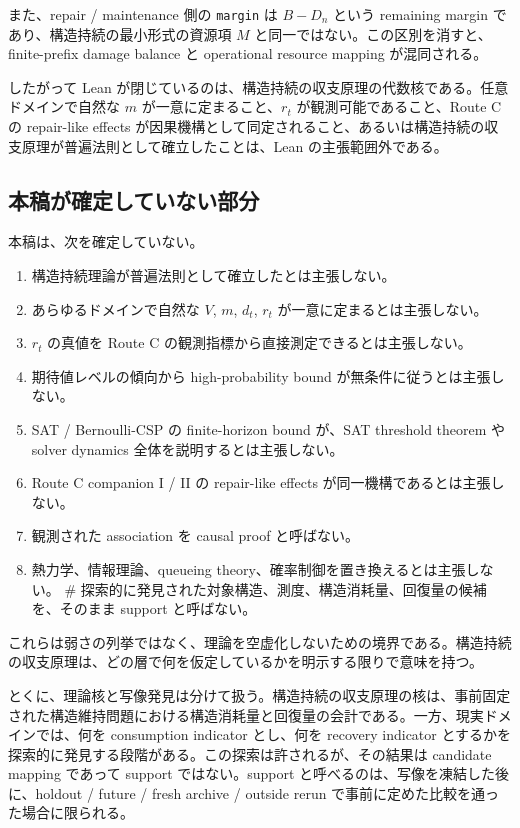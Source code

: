 \documentclass[12pt,a4paper]{article}
\begin{document}
また、repair / maintenance 側の \texttt{margin} は \(B-D_{n}\) という remaining margin であり、構造持続の最小形式の資源項 \(M\) と同一ではない。この区別を消すと、finite-prefix damage balance と operational resource mapping が混同される。

したがって Lean が閉じているのは、構造持続の収支原理の代数核である。任意ドメインで自然な \(m\) が一意に定まること、\(r_{t}\) が観測可能であること、Route C の repair-like effects が因果機構として同定されること、あるいは構造持続の収支原理が普遍法則として確立したことは、Lean の主張範囲外である。

\subsection{本稿が確定していない部分}\label{ux672cux7a3fux304cux78baux5b9aux3057ux3066ux3044ux306aux3044ux90e8ux5206}

本稿は、次を確定していない。

\begin{enumerate}
\def\labelenumi{\arabic{enumi}.}
\tightlist
\item
  構造持続理論が普遍法則として確立したとは主張しない。
\item
  あらゆるドメインで自然な \(V\), \(m\), \(d_{t}\), \(r_{t}\) が一意に定まるとは主張しない。
\item
  \(r_{t}\) の真値を Route C の観測指標から直接測定できるとは主張しない。
\item
  期待値レベルの傾向から high-probability bound が無条件に従うとは主張しない。
\item
  SAT / Bernoulli-CSP の finite-horizon bound が、SAT threshold theorem や solver dynamics 全体を説明するとは主張しない。
\item
  Route C companion I / II の repair-like effects が同一機構であるとは主張しない。
\item
  観測された association を causal proof と呼ばない。
\item
  熱力学、情報理論、queueing theory、確率制御を置き換えるとは主張しない。 \# 探索的に発見された対象構造、測度、構造消耗量、回復量の候補を、そのまま support と呼ばない。
\end{enumerate}

これらは弱さの列挙ではなく、理論を空虚化しないための境界である。構造持続の収支原理は、どの層で何を仮定しているかを明示する限りで意味を持つ。

とくに、理論核と写像発見は分けて扱う。構造持続の収支原理の核は、事前固定された構造維持問題における構造消耗量と回復量の会計である。一方、現実ドメインでは、何を consumption indicator とし、何を recovery indicator とするかを探索的に発見する段階がある。この探索は許されるが、その結果は candidate mapping であって support ではない。support と呼べるのは、写像を凍結した後に、holdout / future / fresh archive / outside rerun で事前に定めた比較を通った場合に限られる。
\end{document}
